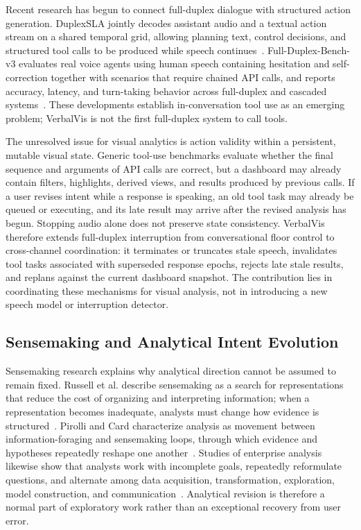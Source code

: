 \documentclass[journal]{IEEEtran}
\begin{document}
Recent research has begun to connect full-duplex dialogue with structured action generation. DuplexSLA jointly decodes assistant audio and a textual action stream on a shared temporal grid, allowing planning text, control decisions, and structured tool calls to be produced while speech continues~\cite{zhang2026duplexsla}. Full-Duplex-Bench-v3 evaluates real voice agents using human speech containing hesitation and self-correction together with scenarios that require chained API calls, and reports accuracy, latency, and turn-taking behavior across full-duplex and cascaded systems~\cite{lin2026fdbv3}. These developments establish in-conversation tool use as an emerging problem; VerbalVis is not the first full-duplex system to call tools.

The unresolved issue for visual analytics is action validity within a persistent, mutable visual state. Generic tool-use benchmarks evaluate whether the final sequence and arguments of API calls are correct, but a dashboard may already contain filters, highlights, derived views, and results produced by previous calls. If a user revises intent while a response is speaking, an old tool task may already be queued or executing, and its late result may arrive after the revised analysis has begun. Stopping audio alone does not preserve state consistency. VerbalVis therefore extends full-duplex interruption from conversational floor control to cross-channel coordination: it terminates or truncates stale speech, invalidates tool tasks associated with superseded response epochs, rejects late stale results, and replans against the current dashboard snapshot. The contribution lies in coordinating these mechanisms for visual analysis, not in introducing a new speech model or interruption detector.

\subsection{Sensemaking and Analytical Intent Evolution}
\label{sec:rw-sensemaking}

Sensemaking research explains why analytical direction cannot be assumed to remain fixed. Russell et al. describe sensemaking as a search for representations that reduce the cost of organizing and interpreting information; when a representation becomes inadequate, analysts must change how evidence is structured~\cite{russell1993cost}. Pirolli and Card characterize analysis as movement between information-foraging and sensemaking loops, through which evidence and hypotheses repeatedly reshape one another~\cite{pirolli2005sensemaking}. Studies of enterprise analysis likewise show that analysts work with incomplete goals, repeatedly reformulate questions, and alternate among data acquisition, transformation, exploration, model construction, and communication~\cite{kandel2012enterprise}. Analytical revision is therefore a normal part of exploratory work rather than an exceptional recovery from user error.
\end{document}
